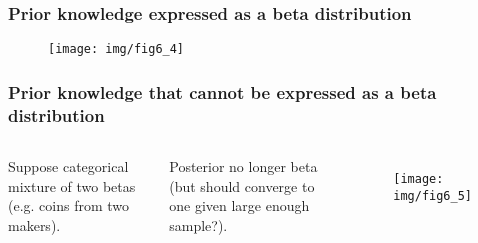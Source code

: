 \documentclass[usenames,dvipsnames,table]{beamer}
\begin{document}
\begin{frame}
\frametitle{Prior knowledge expressed as a beta distribution}
\begin{figure}
\centering
\texttt{[image: img/fig6\_4]}
\end{figure}
\end{frame}


\begin{frame}
\frametitle{Prior knowledge that cannot be expressed as a beta distribution}
\begin{columns}[c]
Suppose categorical mixture of two betas (e.g. coins from two makers).

\vspace{1em}
Posterior no longer beta (but should converge to one given large enough sample?).
\begin{figure}
\centering
\texttt{[image: img/fig6\_5]}
\end{figure}
\end{columns}
\end{frame}
\end{document}
